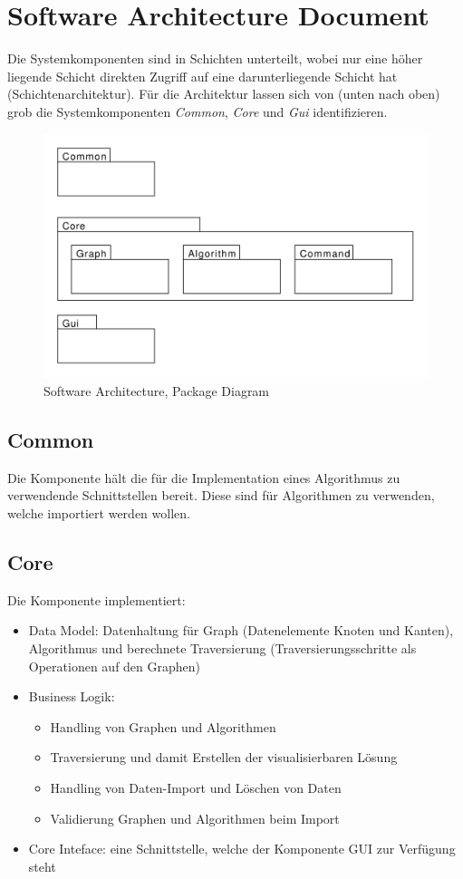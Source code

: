 \section{Software Architecture Document}
\label{sec:Software Architecture Document}
Die Systemkomponenten sind in Schichten unterteilt, wobei nur eine h\"oher liegende Schicht direkten Zugriff auf eine darunterliegende Schicht hat (Schichtenarchitektur). F\"ur die Architektur lassen sich von (unten nach oben) grob die Systemkomponenten \textit{Common}, \textit{Core} und \textit{Gui} identifizieren.
% 
\begin{figure}[H]
    \centering
    \includegraphics[scale=0.5]{diagrams/package-diagram.pdf}
    \caption{Software Architecture, Package Diagram}
    \label{fig:package-diagram}
\end{figure}
% 
\subsection{Common}
\label{subsec:Common}
Die Komponente h\"alt die f\"ur die Implementation eines Algorithmus zu verwendende Schnittstellen bereit. Diese sind f\"ur Algorithmen zu verwenden, welche importiert werden wollen.
% 
\subsection{Core}
\label{subsec:Core}
Die Komponente implementiert:
\begin{itemize}
  \item Data Model: Datenhaltung f\"ur Graph (Datenelemente Knoten und Kanten), Algorithmus und berechnete Traversierung (Traversierungsschritte als Operationen auf den Graphen)
  \item Business Logik: 
  \begin{itemize}
      \item Handling von Graphen und Algorithmen
      \item Traversierung und damit Erstellen der visualisierbaren L\"osung
      \item Handling von Daten-Import und L\"oschen von Daten
      \item Validierung Graphen und Algorithmen beim Import
  \end{itemize}
  \item Core Inteface: eine Schnittstelle, welche der Komponente GUI zur Verf\"ugung steht
\end{itemize}
% 
